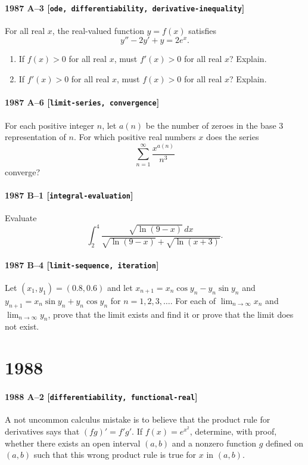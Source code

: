 \documentclass[11pt]{article}
\begin{document}
\paragraph{1987 A--3 \textnormal{[\texttt{ode, differentiability, derivative-inequality}]}}
For all real $x$, the real-valued function $y=f(x)$ satisfies
\[
y''-2y'+y=2e^x.
\]
\begin{enumerate}
\item[(a)] If $f(x)>0$ for all real $x$, must $f'(x) > 0$ for all real $x$? Explain.
\item[(b)] If $f'(x)>0$ for all real $x$, must $f(x) > 0$ for all real $x$? Explain.
\end{enumerate}

\paragraph{1987 A--6 \textnormal{[\texttt{limit-series, convergence}]}}
For each positive integer $n$, let $a(n)$ be the number of zeroes in
the base 3 representation of $n$. For which positive real numbers $x$
does the series
\[
\sum_{n=1}^\infty \frac{x^{a(n)}}{n^3}
\]
converge?

\paragraph{1987 B--1 \textnormal{[\texttt{integral-evaluation}]}}
Evaluate
\[
\int_2^4 \frac{\sqrt{\ln(9-x)}\,dx}{\sqrt{\ln(9-x)}+\sqrt{\ln(x+3)}}.
\]

\paragraph{1987 B--4 \textnormal{[\texttt{limit-sequence, iteration}]}}
Let $(x_1,y_1) = (0.8, 0.6)$ and let $x_{n+1} = x_n \cos y_n - y_n
\sin y_n$ and $y_{n+1}= x_n \sin y_n + y_n \cos y_n$ for
$n=1,2,3,\dots$. For each of $\lim_{n\to \infty} x_n$ and $\lim_{n \to
\infty} y_n$, prove that the limit exists and find it or prove that
the limit does not exist.

\section*{1988}

\paragraph{1988 A--2 \textnormal{[\texttt{differentiability, functional-real}]}}
A not uncommon calculus mistake is to believe that the product rule
for derivatives says that $(fg)' = f'g'$. If $f(x)=e^{x^2}$,
determine, with proof, whether there exists an open interval $(a,b)$
and a nonzero function $g$ defined on $(a,b)$ such that this wrong
product rule is true for $x$ in $(a,b)$.
\end{document}
